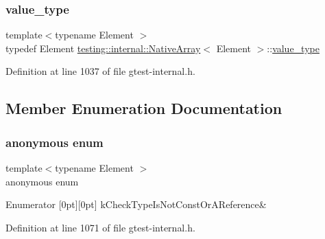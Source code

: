 \subsubsection{\texorpdfstring{value\+\_\+type}{value\_type}}
{\footnotesize\ttfamily template$<$typename Element $>$ \\
typedef Element \hyperlink{classtesting_1_1internal_1_1NativeArray}{testing\+::internal\+::\+Native\+Array}$<$ Element $>$\+::\hyperlink{classtesting_1_1internal_1_1NativeArray_a12216d686e16e4cc63d952fada5b2ba9}{value\+\_\+type}}



Definition at line 1037 of file gtest-\/internal.\+h.



\subsection{Member Enumeration Documentation}
\mbox{\label{classtesting_1_1internal_1_1NativeArray_a14c66e9a884d371ac83e4fb9eb55148e}} 
\subsubsection{\texorpdfstring{anonymous enum}{anonymous enum}}
{\footnotesize\ttfamily template$<$typename Element $>$ \\
anonymous enum\hspace{0.3cm}{\ttfamily [private]}}

\begin{DoxyEnumFields}{Enumerator}
[0pt][0pt]{}\mbox{\label{classtesting_1_1internal_1_1NativeArray_a14c66e9a884d371ac83e4fb9eb55148ea3be52e24b6c1558a819baf99922f9296}} 
k\+Check\+Type\+Is\+Not\+Const\+Or\+A\+Reference&\\
\hline

\end{DoxyEnumFields}


Definition at line 1071 of file gtest-\/internal.\+h.


